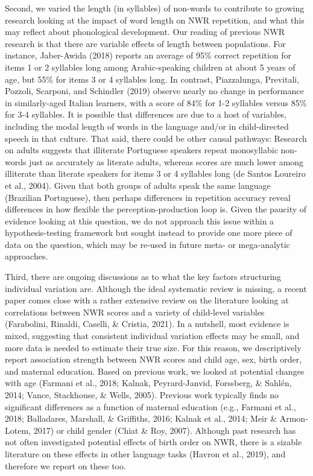 \documentclass[english,,man,floatsintext]{apa6}
\begin{document}
Second, we varied the length (in syllables) of non-words to contribute to growing research looking at the impact of word length on NWR repetition, and what this may reflect about phonological development. Our reading of previous NWR research is that there are variable effects of length between populations. For instance, Jaber-Awida (2018) reports an average of 95\% correct repetition for items 1 or 2 syllables long among Arabic-speaking children at about 5 years of age, but 55\% for items 3 or 4 syllables long. In contrast, Piazzalunga, Previtali, Pozzoli, Scarponi, and Schindler (2019) observe nearly no change in performance in similarly-aged Italian learners, with a score of 84\% for 1-2 syllables versus 85\% for 3-4 syllables. It is possible that differences are due to a host of variables, including the modal length of words in the language and/or in child-directed speech in that culture. That said, there could be other causal pathways: Research on adults suggests that illiterate Portuguese speakers repeat monosyllabic non-words just as accurately as literate adults, whereas scores are much lower among illiterate than literate speakers for items 3 or 4 syllables long (de Santos Loureiro et al., 2004). Given that both groups of adults speak the same language (Brazilian Portuguese), then perhaps differences in repetition accuracy reveal differences in how flexible the perception-production loop is. Given the paucity of evidence looking at this question, we do not approach this issue within a hypothesis-testing framework but sought instead to provide one more piece of data on the question, which may be re-used in future meta- or mega-analytic approaches.

Third, there are ongoing discussions as to what the key factors structuring individual variation are. Although the ideal systematic review is missing, a recent paper comes close with a rather extensive review on the literature looking at correlations between NWR scores and a variety of child-level variables (Farabolini, Rinaldi, Caselli, \& Cristia, 2021). In a nutshell, most evidence is mixed, suggesting that consistent individual variation effects may be small, and more data is needed to estimate their true size. For this reason, we descriptively report association strength between NWR scores and child age, sex, birth order, and maternal education. Based on previous work, we looked at potential changes with age (Farmani et al., 2018; Kalnak, Peyrard-Janvid, Forssberg, \& Sahlén, 2014; Vance, Stackhouse, \& Wells, 2005). Previous work typically finds no significant differences as a function of maternal education (e.g., Farmani et al., 2018; Balladares, Marshall, \& Griffiths, 2016; Kalnak et al., 2014; Meir \& Armon-Lotem, 2017) or child gender (Chiat \& Roy, 2007). Although past research has not often investigated potential effects of birth order on NWR, there is a sizable literature on these effects in other language tasks (Havron et al., 2019), and therefore we report on these too.
\end{document}
